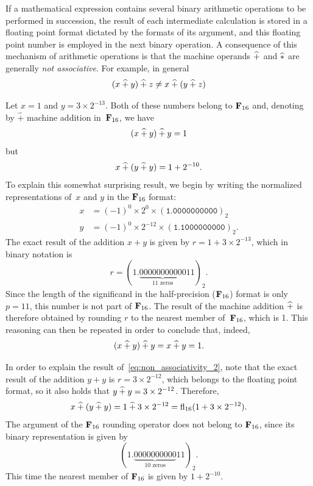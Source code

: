 If a mathematical expression contains several binary arithmetic operations to be performed in succession,
the result of each intermediate calculation is stored in a floating point format dictated by the formats of its argument,
and this floating point number is employed in the next binary operation.
A consequence of this mechanism of arithmetic operations is that the machine operands $\mathbin{\widehat +}$ and $\mathbin{\widehat *}$ are generally \emph{not associative}.
For example, in general
\[
    (x \mathbin{\widehat +} y) \mathbin{\widehat +}  z \neq x \mathbin{\widehat +} (y \mathbin{\widehat +} z)
\]
\begin{example}
    Let $x = 1$ and $y = 3 \times 2^{-13}$.
    Both of these numbers belong to $\mathbf F_{16}$ and,
    denoting by $\widehat +$ machine addition in~$\mathbf F_{16}$,
    we have
    \begin{equation}
        \label{eq:non_associativity_1}
        (x \mathbin{\widehat +} y) \mathbin{\widehat +} y = 1
    \end{equation}
    but
    \begin{equation}
        \label{eq:non_associativity_2}
        x \mathbin{\widehat +} (y \mathbin{\widehat +} y) = 1 + 2^{-10}.
    \end{equation}
    To explain this somewhat surprising result,
    we begin by writing the normalized representations of~$x$ and $y$ in the $\mathbf F_{16}$ format:
    \begin{align*}
        x &= (-1)^0 \times 2^0 \times (\texttt{1.0000000000})_2 \\
        y &= (-1)^0 \times 2^{-12} \times (\texttt{1.1000000000})_2.
    \end{align*}
    The exact result of the addition $x + y$ is given by $r = 1 + 3 \times 2^{-13}$,
    which in binary notation is
    \[
        r = (1.\underbrace{00000000000}_{\text{11 zeros}}11)_2.
    \]
    Since the length of the significand in the half-precision ($\mathbf F_{16}$) format is only $p = 11$,
    this number is not part of $\mathbf F_{16}$.
    The result of the machine addition $\mathbin{\widehat +}$ is therefore obtained by rounding $r$ to the nearest member of~$\mathbf F_{16}$,
    which is 1.
    This reasoning can then be repeated in order to conclude that, indeed,
    \[
        (x \mathbin{\widehat +} y) \mathbin{\widehat +} y = x \mathbin{\widehat +} y = 1.
    \]

    In order to explain the result of~\eqref{eq:non_associativity_2},
    note that the exact result of the addition $y + y$ is $r = 3 \times 2^{-12}$,
    which belongs to the floating point format,
    so it also holds that $y \mathbin{\widehat +} y = 3 \times 2^{-12}$.
    Therefore,
    \[
        x \mathbin{\widehat +} (y \mathbin{\widehat +} y) = 1 \mathbin{\widehat +} 3 \times 2^{-12} = {\rm fl}_{16} (1 + 3 \times 2^{-12}).
    \]
    The argument of the $\mathbf F_{16}$ rounding operator does not belong to $\mathbf F_{16}$,
    since its binary representation is given by
    \[
        (1.\underbrace{0000000000}_{\text{10 zeros}}11)_2.
    \]
    This time the nearest member of $\mathbf F_{16}$ is given by $1 + 2^{-10}$.
\end{example}

